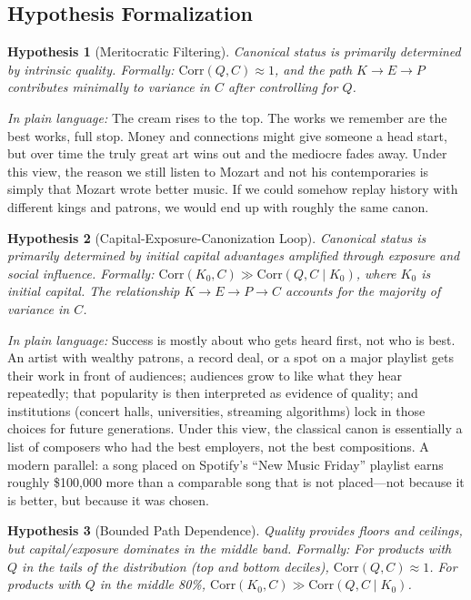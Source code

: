 \documentclass[11pt,a4paper]{article}
\newcommand{\Corr}{\text{Corr}}
\newtheorem{hypothesis}{Hypothesis}
\begin{document}
\subsection{Hypothesis Formalization}

\begin{hypothesis}[Meritocratic Filtering]
\label{hyp:merit}
Canonical status is primarily determined by intrinsic quality. Formally: $\Corr(Q, C) \approx 1$, and the path $K \rightarrow E \rightarrow P$ contributes minimally to variance in $C$ after controlling for $Q$.
\end{hypothesis}

\noindent\textit{In plain language:} The cream rises to the top. The works we remember are the best works, full stop. Money and connections might give someone a head start, but over time the truly great art wins out and the mediocre fades away. Under this view, the reason we still listen to Mozart and not his contemporaries is simply that Mozart wrote better music. If we could somehow replay history with different kings and patrons, we would end up with roughly the same canon.

\begin{hypothesis}[Capital-Exposure-Canonization Loop]
\label{hyp:loop}
Canonical status is primarily determined by initial capital advantages amplified through exposure and social influence. Formally: $\Corr(K_0, C) \gg \Corr(Q, C \mid K_0)$, where $K_0$ is initial capital. The relationship $K \rightarrow E \rightarrow P \rightarrow C$ accounts for the majority of variance in $C$.
\end{hypothesis}

\noindent\textit{In plain language:} Success is mostly about who gets heard first, not who is best. An artist with wealthy patrons, a record deal, or a spot on a major playlist gets their work in front of audiences; audiences grow to like what they hear repeatedly; that popularity is then interpreted as evidence of quality; and institutions (concert halls, universities, streaming algorithms) lock in those choices for future generations. Under this view, the classical canon is essentially a list of composers who had the best employers, not the best compositions. A modern parallel: a song placed on Spotify's ``New Music Friday'' playlist earns roughly \$100,000 more than a comparable song that is not placed---not because it is better, but because it was chosen.

\begin{hypothesis}[Bounded Path Dependence]
\label{hyp:bounded}
Quality provides floors and ceilings, but capital/exposure dominates in the middle band. Formally: For products with $Q$ in the tails of the distribution (top and bottom deciles), $\Corr(Q, C) \approx 1$. For products with $Q$ in the middle 80\%, $\Corr(K_0, C) \gg \Corr(Q, C \mid K_0)$.
\end{hypothesis}
\end{document}
